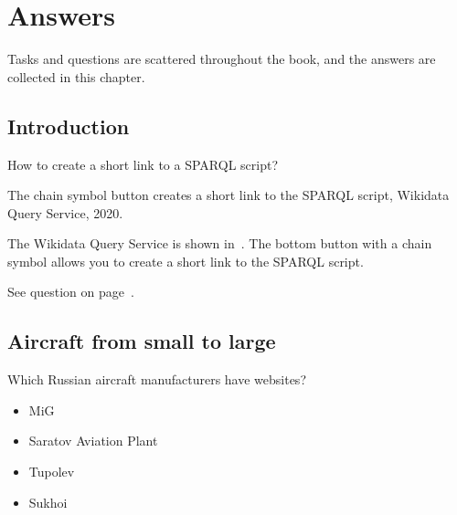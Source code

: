 \setchapterpreamble[u]{\margintoc}
\chapter{Answers}


Tasks and questions are scattered throughout the book, 
and the answers are collected in this chapter.


\section{Introduction}


\begin{exercise}%
    \label{answer:short-link-to-SPARQL}
How to create a short link to a SPARQL script?
\end{exercise}

\begin{marginfigure}[0cm]
    {%
        \setlength{\fboxsep}{0pt}
        \setlength{\fboxrule}{1pt}
    }
	\caption{The chain symbol button creates a short link to the SPARQL script, Wikidata Query Service, 2020.}
\end{marginfigure}

The Wikidata Query Service is shown in~. 
The bottom button with a chain symbol allows you to create a short link to the SPARQL script. 

See question on page~\pageref{question:short-link-to-SPARQL}.



\section{Aircraft from small to large}


\begin{exercise}%
    \label{answer:aircraft_manufacturers_en}
Which Russian aircraft manufacturers have websites?
\begin{itemize}
\item MiG
\item Saratov Aviation Plant
\item Tupolev
\item Sukhoi
\end{itemize}
\end{exercise}

